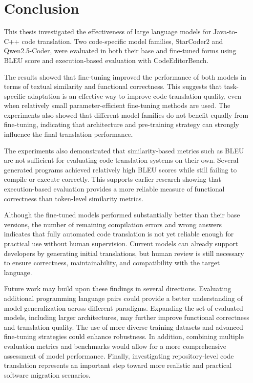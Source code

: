 \chapter{Conclusion}

This thesis investigated the effectiveness of large language models for
Java-to-C++ code translation. Two code-specific model families, StarCoder2 and
Qwen2.5-Coder, were evaluated in both their base and fine-tuned forms using BLEU
score and execution-based evaluation with CodeEditorBench.

The results showed that fine-tuning improved the performance of both models in
terms of textual similarity and functional correctness. This suggests that
task-specific adaptation is an effective way to improve code translation
quality, even when relatively small parameter-efficient fine-tuning methods are
used. The experiments also showed that different model families do not benefit
equally from fine-tuning, indicating that architecture and pre-training strategy
can strongly influence the final translation performance.

The experiments also demonstrated that similarity-based metrics such as BLEU are
not sufficient for evaluating code translation systems on their own. Several
generated programs achieved relatively high BLEU scores while still failing to
compile or execute correctly. This supports earlier research showing that
execution-based evaluation provides a more reliable measure of functional
correctness than token-level similarity metrics.

Although the fine-tuned models performed substantially better than their base
versions, the number of remaining compilation errors and wrong answers indicates
that fully automated code translation is not yet reliable enough for practical
use without human supervision. Current models can already support developers by
generating initial translations, but human review is still necessary to ensure
correctness, maintainability, and compatibility with the target language.

Future work may build upon these findings in several directions. Evaluating
additional programming language pairs could provide a better understanding of
model generalization across different paradigms. Expanding the set of evaluated
models, including larger architectures, may further improve functional
correctness and translation quality. The use of more diverse training datasets
and advanced fine-tuning strategies could enhance robustness. In addition,
combining multiple evaluation metrics and benchmarks would allow for a more
comprehensive assessment of model performance. Finally, investigating
repository-level code translation represents an important step toward more
realistic and practical software migration scenarios.
